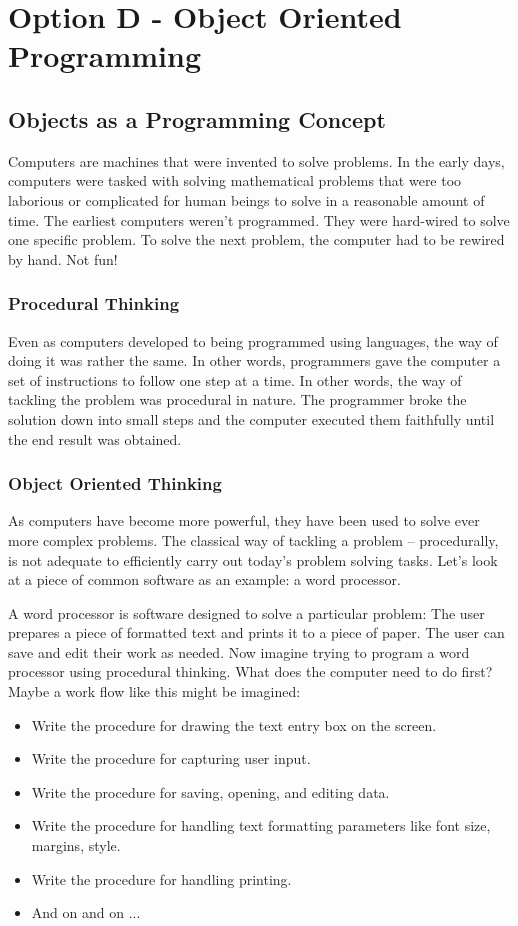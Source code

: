 \chapter{Option D - Object Oriented Programming}

\section{Objects as a Programming Concept}
Computers are machines that were invented to solve problems. In the early days, computers were tasked with solving mathematical problems that were too laborious or complicated for human beings to solve in a reasonable amount of time. The earliest computers weren't programmed. They were hard-wired to solve one specific problem. To solve the next problem, the computer had to be rewired by hand.  Not fun!

\subsection{Procedural Thinking}
Even as computers developed to being programmed using languages, the way of doing it was rather the same. In other words, programmers gave the computer a set of instructions to follow one step at a time. In other words, the way of tackling the problem was procedural in nature. The programmer broke the solution down into small steps and the computer executed them faithfully until the end result was obtained.

\subsection{Object Oriented Thinking}
As computers have become more powerful, they have been used to solve ever more complex problems. The classical way of tackling a problem -- procedurally, is not adequate to efficiently carry out today's problem solving tasks. Let's look at a piece of common software as an example: a word processor.

A word processor is software designed to solve a particular problem: The user prepares a piece of formatted text and prints it to a piece of paper. The user can save and edit their work as needed. Now imagine trying to program a word processor using procedural thinking.  What does the computer need to do first? Maybe a work flow like this might be imagined:

\begin{itemize}
	\item Write the procedure for drawing the text entry box on the screen.
	\item Write the procedure for capturing user input.
	\item Write the procedure for saving, opening, and editing data.
	\item Write the procedure for handling text formatting parameters like font size, margins, style.
	\item Write the procedure for handling printing.
	\item And on and on ...
\end{itemize}

